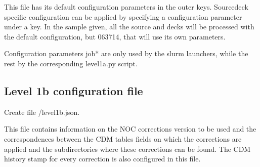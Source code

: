 \documentclass[letterpaper,10pt,english]{sphinxmanual}
\begin{document}
\begin{sphinxVerbatim}[commandchars=\\\{\}]
       
       \PYG{p}{[}\PYG{p}{]}
         \PYG{p}{[}\PYG{p}{]}
       
\end{sphinxVerbatim}

This file has its default configuration parameters in the outer keys.
Source\sphinxhyphen{}deck specific configuration can be applied by specifying a configuration
parameter under a  key. In the sample given, all the
source and decks will be processed with the default configuration, but 063\sphinxhyphen{}714,
that will use its own parameters.

Configuration parameters job* are only used by the slurm launchers, while the
rest by the corresponding level1a.py script.


\subsection{Level 1b configuration file}
\label{\detokenize{index:level-1b-configuration-file}}\label{\detokenize{index:level1b-config-file}}
Create file /level1b.json.

This file contains information on
the NOC corrections version to be used and the correspondences between the
CDM tables fields on which the corrections are applied and the subdirectories
where these corrections can be found. The CDM history stamp for every correction
is also configured in this file.
\end{document}
